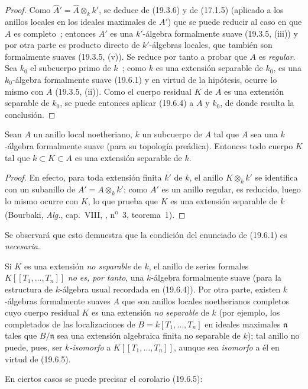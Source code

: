 \begin{proof}
Como $\widehat A'=\widehat A\otimes_k k'$, se deduce de (19.3.6) y de
(17.1.5) (aplicado a los anillos locales en los ideales maximales de $A'$) que se
puede reducir al caso en que $A$ es completo~; entonces $A'$ es una $k'$-álgebra
formalmente suave (19.3.5, (iii)) y por otra parte es producto directo de
$k'$-álgebras locales, que también son formalmente suaves (19.3.5, (v)). Se
reduce por tanto a probar que $A$ es \emph{regular}. Sea $k_0$ el subcuerpo
primo de $k$~; como $k$ es una extensión separable de $k_0$, es una
$k_0$-álgebra formalmente suave (19.6.1) y en virtud de la hipótesis, ocurre lo
mismo con $A$ (19.3.5, (ii)). Como el cuerpo residual $K$ de $A$ es una
extensión separable de $k_0$, se puede entonces aplicar (19.6.4) a $A$ y $k_0$,
de donde resulta la conclusión.
\end{proof}

 
\begin{corollary}[19.6.5.1]
\label{0.19.6.5.1-fr}
Sean $A$ un anillo local noetheriano, $k$ un subcuerpo de $A$ tal que $A$
sea una $k$-álgebra formalmente suave (para su topología preádica). Entonces
todo cuerpo $K$ tal que $k\subset K\subset A$ es una extensión separable de
$k$.
\end{corollary}

\begin{proof}
En efecto, para toda extensión finita $k'$ de $k$, el anillo $K\otimes_k k'$
se identifica con un subanillo de $A'=A\otimes_k k'$; como $A'$ es un anillo
regular, es reducido, luego lo mismo ocurre con $K$, lo que prueba que $K$
es una extensión separable de $k$ (Bourbaki, \emph{Alg.}, cap.~VIII,
, n\textsuperscript{o}~3, teorema~1).
\end{proof}

Se observará que esto demuestra que la condición del enunciado de (19.6.1) es
\emph{necesaria}.

\begin{remark}[19.6.5.2]
\label{0.19.6.5.2-fr}
Si $K$ es una extensión \emph{no separable} de $k$, el anillo de series
formales $K[[T_1,\ldots,T_n]]$ \emph{no es, por tanto}, una $k$-álgebra
formalmente suave (para la estructura de $k$-álgebra usual recordada en
(19.6.4)). Por otra parte, existen $k$-álgebras formalmente suaves $A$ que
son anillos locales noetherianos completos cuyo cuerpo residual $K$ es una
extensión \emph{no separable} de $k$ (por ejemplo, los completados de las
localizaciones de $B=k[T_1,\ldots,T_n]$ en ideales maximales $\mathfrak n$ tales
que $B/\mathfrak n$ sea una extensión algebraica finita no separable de $k$);
tal anillo no puede, pues, ser \emph{$k$-isomorfo} a $K[[T_1,\ldots,T_n]]$, aunque
sea \emph{isomorfo} a él en virtud de (19.6.5).

En ciertos casos se puede precisar el corolario (19.6.5):
\end{remark}

